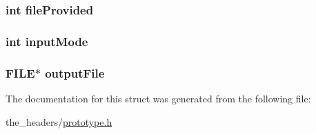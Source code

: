 \subsubsection[{\texorpdfstring{file\+Provided}{fileProvided}}]{\setlength{\rightskip}{0pt plus 5cm}int file\+Provided}\hypertarget{structgame__t_a99494c1e05fbe120bb600a81281066a3}{}\label{structgame__t_a99494c1e05fbe120bb600a81281066a3}
\subsubsection[{\texorpdfstring{input\+Mode}{inputMode}}]{\setlength{\rightskip}{0pt plus 5cm}int input\+Mode}\hypertarget{structgame__t_a1518cba187fa72a6e7a6d14c851bcfa3}{}\label{structgame__t_a1518cba187fa72a6e7a6d14c851bcfa3}
\subsubsection[{\texorpdfstring{output\+File}{outputFile}}]{\setlength{\rightskip}{0pt plus 5cm}F\+I\+LE$\ast$ output\+File}\hypertarget{structgame__t_af90684c72474cb2cd16f4458941e6988}{}\label{structgame__t_af90684c72474cb2cd16f4458941e6988}


The documentation for this struct was generated from the following file\+:\begin{DoxyCompactItemize}
\item 
the\+\_\+headers/\hyperlink{prototype_8h}{prototype.\+h}\end{DoxyCompactItemize}
